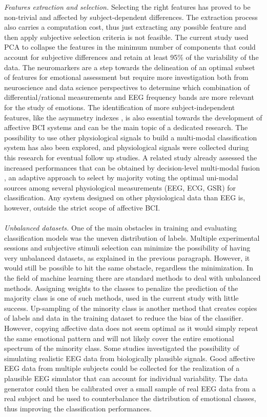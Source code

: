 \emph{Features extraction and selection.} Selecting the right features has proved to be non-trivial and affected by subject-dependent differences. The extraction process also carries a computation cost, thus just extracting any possible feature and then apply subjective selection criteria is not feasible. The current study used \ac{PCA} to collapse the features in the minimum number of components that could account for subjective differences and retain at least 95\% of the variability of the data. The neuromarkers are a step towards the delineation of an optimal subset of features for emotional assessment but require more investigation both from neuroscience and data science perspectives to determine which combination of differential/rational measurements and EEG frequency bands are more relevant for the study of emotions. The identification of more subject-independent features, like the asymmetry indexes \cite{lin_toward_2015}, is also essential towards the development of affective \ac{BCI} systems and can be the main topic of a dedicated research. The possibility to use other physiological signals to build a multi-modal classification system has also been explored, and physiological signals were collected during this research for eventual follow up studies. A related study already assessed the increased performances that can be obtained by decision-level multi-modal fusion \cite{thammasan_multimodal_2017}, an adaptive approach to select by majority voting the optimal uni-modal sources among several physiological measurements (\ac{EEG}, \ac{ECG}, \ac{GSR}) for classification. Any system designed on other physiological data than \ac{EEG} is, however, outside the strict scope of affective \ac{BCI}.
\\
\\
\emph{Unbalanced datasets.} One of the main obstacles in training and evaluating classification models was the uneven distribution of labels. Multiple experimental sessions and subjective stimuli selection can minimize the possibility of having very unbalanced datasets, as explained in the previous paragraph. However, it would still be possible to hit the same obstacle, regardless the minimization. In the field of machine learning there are standard methods to deal with unbalanced methods. Assigning weights to the classes to penalize the prediction of the majority class is one of such methods, used in the current study with little success. Up-sampling of the minority class is another method that creates copies of labels and data in the training dataset to reduce the bias of the classifier. However, copying affective data does not seem optimal as it would simply repeat the same emotional pattern and will not likely cover the entire emotional spectrum of the minority class. Some studies investigated the possibility of simulating realistic \ac{EEG} data \cite{barzegaran_eegsourcesim_2019} from biologically plausible signals. Good affective \ac{EEG} data from multiple subjects could be collected for the realization of a plausible \ac{EEG}  simulator that can account for individual variability. The data generator could then be calibrated over a small sample of real \ac{EEG}  data from a real subject and be used to counterbalance the distribution of emotional classes, thus improving the classification performances.
